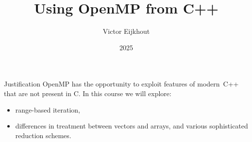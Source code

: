 \documentclass[10pt]{beamer}
\begin{document}
\title[OMP \& C++]{Using OpenMP from C++}
\author[Eijkhout]{Victor Eijkhout}
\date{2025}

\maketitle

\begin{frame}{Justification}
  OpenMP has the opportunity to exploit features of modern~C++
  that are not present in C.
  In this course we will explore:
  \begin{itemize}
  \item
    range-based iteration,
  \item
    differences in treatment between vectors and arrays,
    and various sophisticated reduction schemes.
  \end{itemize}

\end{frame}








\end{document}
